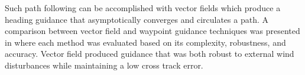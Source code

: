 \documentclass[conf]{new-aiaa}
\begin{document}
 


%
%


 
%
%

	
Such path following can be accomplished with vector fields which produce a heading guidance that asymptotically converges and circulates a path. A comparison between vector field and waypoint guidance techniques was presented in \cite{sujit_unmanned_2014} where each method was evaluated based on its complexity, robustness, and accuracy. Vector field produced guidance that was both robust to external wind disturbances while maintaining a low cross track error. \\
\end{document}
